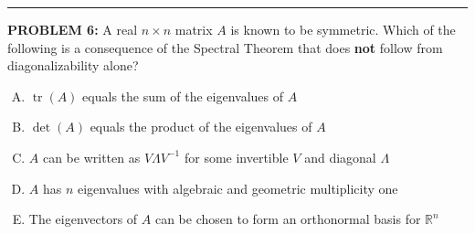 \documentclass[12pt]{amsart}
\newcommand{\divider}{
  \vspace{-1em} %
  \noindent
  \raisebox{-0.15ex}{\textbullet}%
  \hspace{0.5em}%
  \rule[0.5ex]{0.95\textwidth}{1.0pt}%
  \hspace{0.5em}%
  \raisebox{-0.15ex}{\textbullet}%
  \vspace{0em} %
}
\begin{document}
%
%
%

\vspace{0.5in}

\divider



{\bf PROBLEM 6:}
%
A real $n \times n$ matrix $A$ is known to be symmetric.
%
Which of the following is a consequence of the Spectral Theorem that does 
\textbf{not} follow from diagonalizability alone?

\begin{enumerate}[(A)]
\item $\operatorname{tr}(A)$ equals the sum of the eigenvalues of $A$
\item $\det(A)$ equals the product of the eigenvalues of $A$
\item $A$ can be written as $V\Lambda V^{-1}$ for some invertible $V$ 
      and diagonal $\Lambda$
\item $A$ has $n$ eigenvalues with algebraic and geometric multiplicity one
\item The eigenvectors of $A$ can be chosen to form an orthonormal basis 
      for $\mathbb{R}^n$
\end{enumerate}
\end{document}
